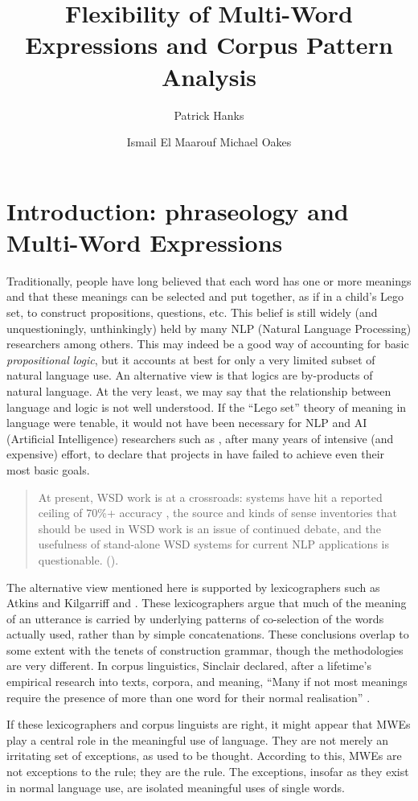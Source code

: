 \documentclass[output=paper]{langsci/langscibook}
\author{Patrick Hanks\affiliation{RIILP, University of Wolverhampton, England}%
\and Ismail El Maarouf\affiliation{RIILP, Adarga Ltd., England}%
\lastand Michael Oakes\affiliation{RIILP, University of Wolverhampton, England}}
\title{Flexibility of Multi-Word Expressions and Corpus Pattern Analysis}
\begin{document}
\section{Introduction: phraseology and Multi-Word Expressions}

Traditionally, people have long believed that each word has one or more
meanings and that these meanings can be selected and put together, as
if in a child’s Lego set, to construct propositions, questions, etc.
This belief is still widely (and unquestioningly, unthinkingly) held by
many NLP (Natural Language Processing) researchers among others. This
may indeed be a good way of accounting for basic
\textit{propositional}
\textit{logic}, but it accounts at best for only a
very limited subset of natural language use. An alternative view is
that logics are by-products of natural language. At the very least, we
may say that the relationship between language and logic is not well
understood. If the “Lego set” theory of meaning in language were
tenable, it would not have been necessary for NLP and AI (Artificial
Intelligence) researchers such as \cite{ide2006}, after many
years of intensive (and expensive) effort, to declare that projects in
 have failed to achieve even their most
basic goals.


\begin{quotation}
At present, WSD work is at a crossroads: systems have hit a reported
ceiling of 70\%+ accuracy \citep{kilgarriff2004}, the source and
kinds of sense inventories that should be used in WSD work is an issue
of continued debate, and the usefulness of stand-alone WSD systems for
current NLP applications is questionable. (\citealt[15]{ide2006}).
\end{quotation}


The alternative view mentioned here is supported by lexicographers such
as Atkins and Kilgarriff  and \cite{hanks2000}.
These lexicographers argue that much of the meaning of an utterance is
carried by underlying patterns of co-selection of the words actually
used, rather than by simple concatenations. These conclusions overlap
to some extent with the tenets of construction grammar, though the
methodologies are very different. In corpus linguistics, Sinclair
declared, after a lifetime’s empirical research into texts, corpora,
and meaning, “Many if not most meanings require the presence of more
than one word for their normal realisation” \citep[4]{sinclair1998}.



If these lexicographers and corpus linguists are right, it might appear
that MWEs play a central role in the meaningful use of language. They
are not merely an irritating set of exceptions, as used to be thought.
According to this, MWEs are not exceptions to the rule; they are the
rule. The exceptions, insofar as they exist in normal language use, are
isolated meaningful uses of single words.
\end{document}
